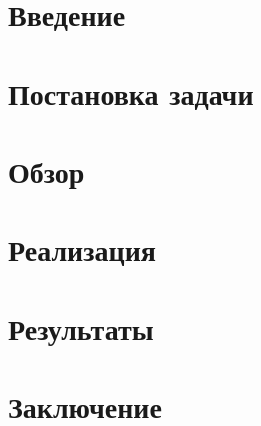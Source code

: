 



\maketitle
\setcounter{tocdepth}{2}
\tableofcontents

\section{Введение}


\section{Постановка задачи}


\section{Обзор}


\section{Реализация}


\section{Результаты}


\section{Заключение}


\setmonofont[Mapping=tex-text]{CMU Typewriter Text}



